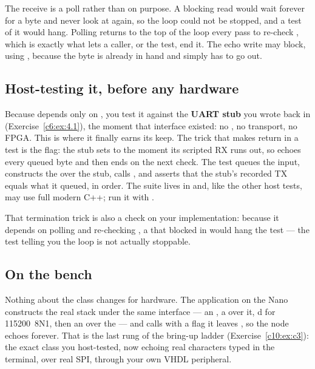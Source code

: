 The receive is a poll rather than  on purpose. A blocking read would wait
forever for a byte and never look at  again, so the loop could not be stopped, and a test
of it would hang. Polling  returns to the top of the loop every pass to re-check
, which is exactly what lets a caller, or the test, end it. The echo write may block,
using , because the byte is already in hand and simply has to go out.

\subsection{Host-testing it, before any hardware}
\label{c10:sec:echo_test}
Because  depends only on , you test it against the
\textbf{UART stub} you wrote back in  (Exercise~\ref{c6:ex:4.1}), the moment that
interface existed: no , no transport, no FPGA. This is where it finally earns its keep.
The trick that makes  return in a test is the  flag: the stub sets
 to  the moment its scripted RX runs out, so  echoes every queued
byte and then ends on the next check. The test queues the input, constructs the  over
the stub, calls , and asserts that the stub's recorded TX equals what it queued, in
order. The suite lives in  and, like the other host tests, may use
full modern C++; run it with .

That termination trick is also a check on your implementation: because it depends on 
polling  and re-checking , a  that blocked in
 would hang the test --- the test telling you the loop is not actually
stoppable.

\subsection{On the bench}
\label{c10:sec:echo_bench}
Nothing about the class changes for hardware. The application  on the Nano constructs
the real stack under the same interface --- an , a  over it,
d for 115200~8N1, then an  over the  --- and calls
 with a  flag it leaves , so the node echoes forever. That is the
last rung of the bring-up ladder (Exercise~\ref{c10:ex:c3}): the exact class you host-tested, now
echoing real characters typed in the terminal, over real SPI, through your own VHDL peripheral.

